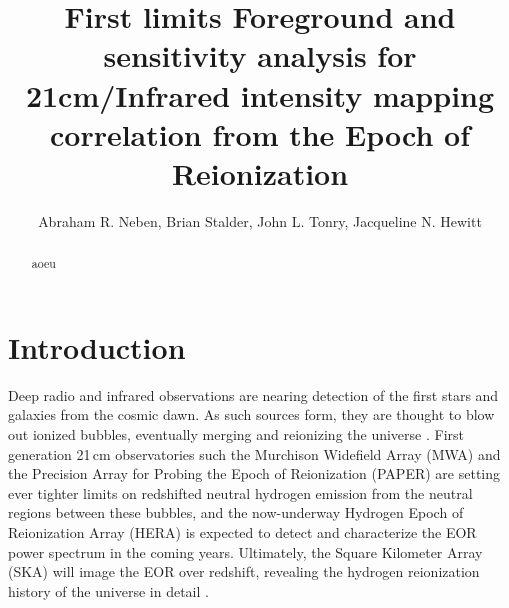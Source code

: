 \documentclass{emulateapj}
\begin{document}
\title{First limits Foreground and sensitivity analysis for 21cm/Infrared intensity mapping correlation from the Epoch of Reionization}


\author{Abraham R. Neben,
Brian Stalder,
John L. Tonry,
Jacqueline N. Hewitt}




\begin{abstract}
aoeu
\end{abstract}


\section{Introduction}

Deep radio and infrared observations are nearing detection of the first stars and galaxies from the cosmic dawn. As such sources form, they are thought to blow out ionized bubbles, eventually merging and reionizing the universe \citep{FurlanettoReview,miguelreview,PritchardLoebReview}. First generation 21\,cm observatories such the Murchison Widefield Array (MWA) \citep{tingay13,mwascience} and the Precision Array for Probing the Epoch of Reionization (PAPER) \citep{parsons14,ali15,PoberPAPER64Heating,DannyMultiRedshift} are setting ever tighter limits on redshifted neutral hydrogen emission from the neutral regions between these bubbles, and the now-underway Hydrogen Epoch of Reionization Array (HERA) \citep{deboer16} is expected to detect and characterize the EOR power spectrum in the coming years. Ultimately, the Square Kilometer Array (SKA) will image the EOR over redshift, revealing the hydrogen reionization history of the universe in detail \citep{ska}. 
\end{document}
